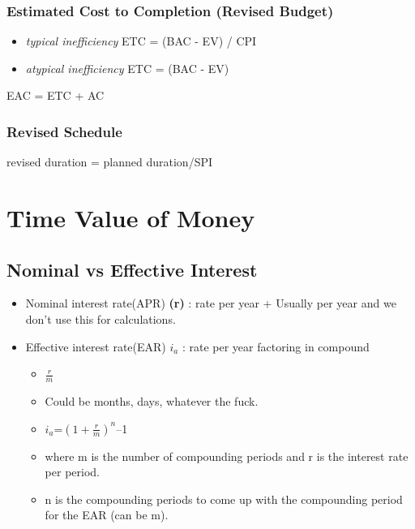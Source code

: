 \documentclass[]{article}
\providecommand{\tightlist}{%
  \setlength{\itemsep}{0pt}\setlength{\parskip}{0pt}}
\begin{document}
\hypertarget{estimated-cost-to-completion-revised-budget}{%
\subsubsection{Estimated Cost to Completion (Revised
Budget)}\label{estimated-cost-to-completion-revised-budget}}

\begin{itemize}
\tightlist
\item
  \emph{typical inefficiency} ETC = (BAC - EV) / CPI
\item
  \emph{atypical inefficiency} ETC = (BAC - EV)
\end{itemize}

EAC = ETC + AC

\hypertarget{revised-schedule}{%
\subsubsection{Revised Schedule}\label{revised-schedule}}

revised duration = planned duration/SPI

\hypertarget{time-value-of-money}{%
\section{Time Value of Money}\label{time-value-of-money}}

\hypertarget{nominal-vs-effective-interest}{%
\subsection{Nominal vs Effective
Interest}\label{nominal-vs-effective-interest}}

\begin{itemize}
\tightlist
\item
  Nominal interest rate(APR) \textbf{(r)} : rate per year + Usually per
  year and we don't use this for calculations.\\
\item
  Effective interest rate(EAR) \textbf{\(i_{a}\)} : rate per year
  factoring in compound

  \begin{itemize}
  \tightlist
  \item
    \(\frac{r}{m}\)
  \item
    Could be months, days, whatever the fuck.\\
  \item
    \(i_{a}\)=\((1+\frac{r}{m})^{n}\)--1
  \item
    where m is the number of compounding periods and r is the interest
    rate per period.\\
  \item
    n is the compounding periods to come up with the compounding period
    for the EAR (can be m).
  \end{itemize}
\end{itemize}
\end{document}
